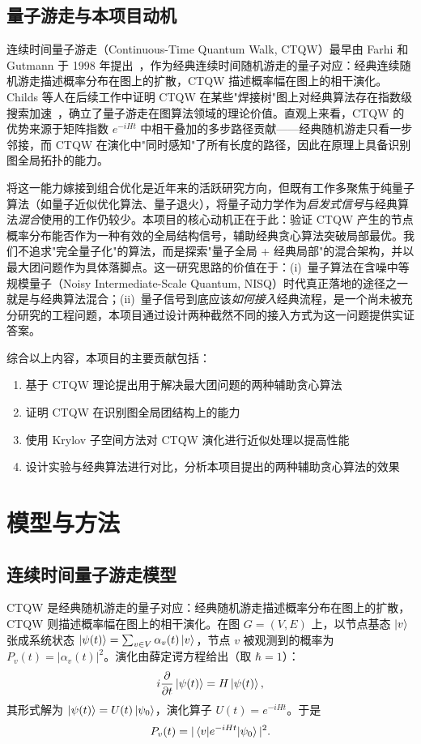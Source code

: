 \documentclass[pre,twocolumn]{revtex4-2}
\begin{document}
\subsection{量子游走与本项目动机}
连续时间量子游走（Continuous-Time Quantum Walk, CTQW）最早由 Farhi 和 Gutmann 于 1998 年提出~\cite{farhi1998}，作为经典连续时间随机游走的量子对应：经典连续随机游走描述概率分布在图上的扩散，CTQW 描述概率幅在图上的相干演化。Childs 等人在后续工作中证明 CTQW 在某些"焊接树"图上对经典算法存在指数级搜索加速~\cite{childs2009}，确立了量子游走在图算法领域的理论价值。直观上来看，CTQW 的优势来源于矩阵指数 $e^{-iHt}$ 中相干叠加的多步路径贡献——经典随机游走只看一步邻接，而 CTQW 在演化中"同时感知"了所有长度的路径，因此在原理上具备识别图全局拓扑的能力。

将这一能力嫁接到组合优化是近年来的活跃研究方向，但既有工作多聚焦于纯量子算法（如量子近似优化算法、量子退火），将量子动力学作为\emph{启发式信号}与经典算法\emph{混合}使用的工作仍较少。本项目的核心动机正在于此：验证 CTQW 产生的节点概率分布能否作为一种有效的全局结构信号，辅助经典贪心算法突破局部最优。我们不追求"完全量子化"的算法，而是探索"量子全局 + 经典局部"的混合架构，并以最大团问题作为具体落脚点。这一研究思路的价值在于：(i)~量子算法在含噪中等规模量子（Noisy Intermediate-Scale Quantum, NISQ）时代真正落地的途径之一就是与经典算法混合；(ii)~量子信号到底应该\emph{如何接入}经典流程，是一个尚未被充分研究的工程问题，本项目通过设计两种截然不同的接入方式为这一问题提供实证答案。

综合以上内容，本项目的主要贡献包括：
\begin{enumerate}
    \item 基于 CTQW 理论提出用于解决最大团问题的两种辅助贪心算法
    \item 证明 CTQW 在识别图全局团结构上的能力
    \item 使用 Krylov 子空间方法对 CTQW 演化进行近似处理以提高性能
    \item 设计实验与经典算法进行对比，分析本项目提出的两种辅助贪心算法的效果
\end{enumerate}

\section{模型与方法}

\subsection{连续时间量子游走模型}
CTQW 是经典随机游走的量子对应：经典随机游走描述概率分布在图上的扩散，CTQW 则描述概率幅在图上的相干演化。在图 $G=(V,E)$ 上，以节点基态 $\ket{v}$ 张成系统状态 $\ket{\psi(t)}=\sum_{v\in V}\alpha_v(t)\ket{v}$，节点 $v$ 被观测到的概率为 $P_v(t)=|\alpha_v(t)|^2$。演化由薛定谔方程给出（取 $\hbar=1$）：
\begin{equation}
i\frac{\partial}{\partial t}\ket{\psi(t)}=H\ket{\psi(t)},
\end{equation}
其形式解为 $\ket{\psi(t)}=U(t)\ket{\psi_0}$，演化算子 $U(t)=e^{-iHt}$。于是
\begin{equation}
P_v(t)=|\braket{v|e^{-iHt}|\psi_0}|^2.
\label{eq:prob}
\end{equation}
\end{document}
